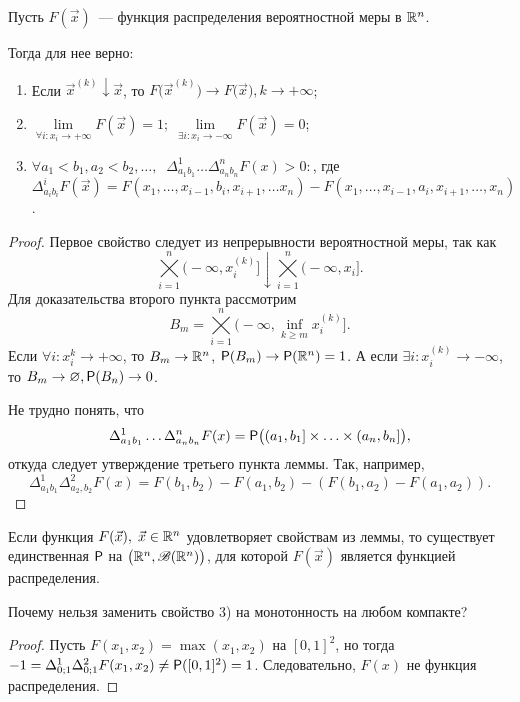 \begin{lemma}
	Пусть $F(\vec x)$~--- функция распределения вероятностной меры в $\R^n$.
	
	Тогда для нее верно:
	\begin{enumerate}
		\item Если $\vec x^{(k)} \downarrow \vec x$, то $F\big(\vec x^{(k)}\big) \rightarrow F\big(\vec x\big), k \rightarrow +\infty$;
		\item $\lim\limits_{\forall i : x_i \rightarrow +\infty} F(\vec x) = 1;\; \lim\limits_{\exists i : x_i \rightarrow -\infty} F(\vec x) = 0$;
		\item $\forall a_1 < b_1, a_2 < b_2, \ldots,\;\; \Delta_{a_1b_1}^1 \ldots \Delta_{a_nb_n}^nF(x) > 0 :$, где \\
		$\Delta_{a_ib_i}^i F(\vec x) = F(x_1, \ldots, x_{i - 1}, b_i, x_{i + 1}, \ldots x_n) - F(x_1, \ldots, x_{i - 1}, a_i, x_{i + 1}, \ldots, x_n)$.
	\end{enumerate}
	\begin{proof}
		Первое свойство следует из непрерывности вероятностной меры, так как $$\bigtimes\limits_{i = 1}^n\big(-\infty, x_i^{(k)}\big] \downarrow \bigtimes\limits_{i = 1}^n \big(-\infty, x_i\big].$$
		Для доказательства второго пункта рассмотрим
		$$B_m = \bigtimes\limits_{i = 1}^n\big(-\infty, \inf\limits_{k \geqslant m} x_i^{(k)}\big].$$
		Если $\forall i : x_i^k \rightarrow +\infty$, то $B_m \rightarrow \R^n$, $\P(B_m) \rightarrow \P(\R^n) = 1$. А если $\exists i : x_i^{(k)} \rightarrow - \infty$, то $B_m \rightarrow \varnothing, \P(B_n) \rightarrow 0$.
		
		Не трудно понять, что 
		$$\Delta_{a_1b_1}^1 \ldots \Delta_{a_nb_n}^nF(x) = \P\big((a_1, b_1] \times \ldots \times (a_n, b_n]\big),$$
		откуда следует утверждение третьего пункта леммы. Так, например,
		$$\Delta_{a_1b_1}^1\Delta_{a_2,b_2}^2F(x) = F(b_1,b_2) - F(a_1,b_2) - (F(b_1,a_2) - F(a_1,a_2)).$$
	\end{proof}
\end{lemma}

\begin{theorem}
	Если функция $F(\vec x),\; \vec x \in \R^n$ удовлетворяет свойствам из леммы, то существует единственная $\P$ на $\big(\R^n, \B(\R^n) \big)$, для которой $F(\vec x)$ является функцией распределения.
\end{theorem}

\begin{note}
	Почему нельзя заменить свойство 3) на монотонность на любом компакте? 
	\begin{proof}
		Пусть $F(x_1, x_2) = \max(x_1, x_2)$ на $[0, 1]^2$, но тогда $-1 = \Delta_{0; 1}^1 \Delta_{0; 1}^2 F(x_1, x_2) \neq \P([0, 1]^2) = 1$. Следовательно, $F(x)$ не функция распределения.
	\end{proof}
\end{note}

